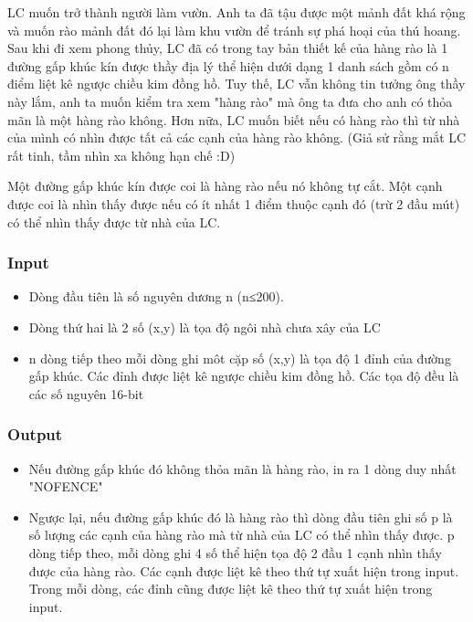 



   LC muốn trở thành người làm vườn. Anh ta đã tậu được một mảnh đất khá rộng và muốn rào mảnh đất đó lại làm khu vườn để tránh sự phá hoại của thú hoang. Sau khi đi xem phong thủy, LC đã có trong tay bản thiết kế của hàng rào là 1 đường gấp khúc kín được thầy địa lý thể hiện dưới dạng 1 danh sách gồm có n điểm liệt kê ngược chiều kim đồng hồ. Tuy thế, LC vẫn không tin tưởng ông thầy này lắm, anh ta muốn kiểm tra xem "hàng rào" mà ông ta đưa cho anh có thỏa mãn là một hàng rào không. Hơn nữa, LC muốn biết nếu có hàng rào thì từ nhà của mình có nhìn được tất cả các cạnh của hàng rào không. (Giả sử rằng mắt LC rất tinh, tầm nhìn xa không hạn chế :D)  

Một đường gấp khúc kín được coi là hàng rào nếu nó không tự cắt. Một cạnh được coi là nhìn thấy được nếu có ít nhất 1 điểm thuộc cạnh đó (trừ 2 đầu mút) có thể nhìn thấy được từ nhà của LC.

\subsubsection{   Input  }
\begin{itemize}
	\item     Dòng đầu tiên là số nguyên dương n (n≤200).   
	\item     Dòng thứ hai là 2 số (x,y) là tọa độ ngôi nhà chưa xây của LC   
	\item     n dòng tiếp theo mỗi dòng ghi môt cặp số (x,y) là tọa độ 1 đỉnh của đường gấp khúc. Các đỉnh được liệt kê ngược chiều kim đồng hồ. Các tọa độ đều là các số nguyên 16-bit   
\end{itemize}

\subsubsection{   Output  }
\begin{itemize}
	\item     Nếu đường gấp khúc đó không thỏa mãn là hàng rào, in ra 1 dòng duy nhất "NOFENCE"   
	\item     Ngược lại, nếu đường gấp khúc đó là hàng rào thì dòng đầu tiên ghi số p là số lượng các cạnh của hàng rào mà từ nhà của LC có thể nhìn thấy được. p dòng tiếp theo, mỗi dòng ghi 4 số thể hiện tọa độ 2 đầu 1 cạnh nhìn thấy được của hàng rào. Các cạnh được liệt kê theo thứ tự xuất hiện trong input. Trong mỗi dòng, các đỉnh cũng được liệt kê theo thứ tự xuất hiện trong input.   
\end{itemize}

